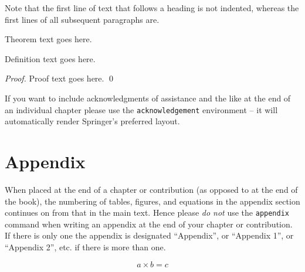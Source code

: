 \documentclass[graybox]{svmult}
\begin{document}
Note that the first line of text that follows a heading is not indented, whereas the first lines of all subsequent paragraphs are.
%
%
\begin{theorem}
Theorem text goes here.
\end{theorem}
%
\begin{definition}
Definition text goes here.
\end{definition}
%
\begin{proof}
\smartqed
Proof text goes here.
\qed
\end{proof}
%
\begin{acknowledgement}
If you want to include acknowledgments of assistance and the like at the end of an individual chapter please use the \verb|acknowledgement| environment -- it will automatically render Springer's preferred layout.
\end{acknowledgement}
%
\section*{Appendix}
%
%
When placed at the end of a chapter or contribution (as opposed to at the end of the book), the numbering of tables, figures, and equations in the appendix section continues on from that in the main text. Hence please \textit{do not} use the \verb|appendix| command when writing an appendix at the end of your chapter or contribution. If there is only one the appendix is designated ``Appendix'', or ``Appendix 1'', or ``Appendix 2'', etc. if there is more than one.

\begin{equation}
a \times b = c
\end{equation}

%
\end{document}
